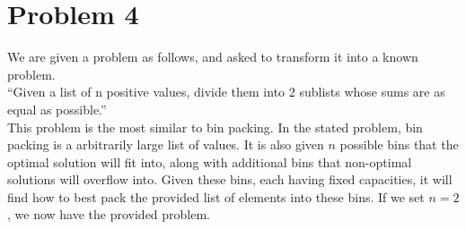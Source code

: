 \section*{Problem 4}

We are given a problem as follows, and asked to transform it into a known problem.
\\
``Given a list of n positive values, divide them into 2 sublists whose sums are as equal as possible.''
\\
This problem is the most similar to bin packing. In the stated problem, bin packing is a arbitrarily large list of values. It is also given $n$ possible bins that the optimal solution will fit into, along with additional bins that non-optimal solutions will overflow into. Given these bins, each having fixed capacities, it will find how to best pack the provided list of elements into these bins. If we set $n=2$, we now have the provided problem. 